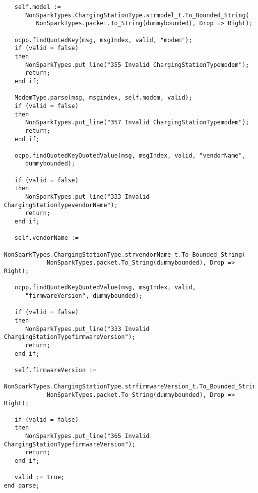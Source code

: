 \documentclass[12pt,openany,a4paper]{book}
\begin{document}
\begin{verbatim}
   self.model :=
      NonSparkTypes.ChargingStationType.strmodel_t.To_Bounded_String(
         NonSparkTypes.packet.To_String(dummybounded), Drop => Right);

   ocpp.findQuotedKey(msg, msgIndex, valid, "modem");
   if (valid = false) 
   then 
      NonSparkTypes.put_line("355 Invalid ChargingStationTypemodem"); 
      return; 
   end if;

   ModemType.parse(msg, msgindex, self.modem, valid);
   if (valid = false) 
   then 
      NonSparkTypes.put_line("357 Invalid ChargingStationTypemodem"); 
      return; 
   end if;

   ocpp.findQuotedKeyQuotedValue(msg, msgIndex, valid, "vendorName", 
      dummybounded);

   if (valid = false) 
   then 
      NonSparkTypes.put_line("333 Invalid ChargingStationTypevendorName"); 
      return; 
   end if;

   self.vendorName := 
         NonSparkTypes.ChargingStationType.strvendorName_t.To_Bounded_String(
            NonSparkTypes.packet.To_String(dummybounded), Drop => Right);

   ocpp.findQuotedKeyQuotedValue(msg, msgIndex, valid, 
      "firmwareVersion", dummybounded);

   if (valid = false) 
   then 
      NonSparkTypes.put_line("333 Invalid ChargingStationTypefirmwareVersion"); 
      return; 
   end if;

   self.firmwareVersion := 
      NonSparkTypes.ChargingStationType.strfirmwareVersion_t.To_Bounded_String(
            NonSparkTypes.packet.To_String(dummybounded), Drop => Right);

   if (valid = false) 
   then 
      NonSparkTypes.put_line("365 Invalid ChargingStationTypefirmwareVersion"); 
      return; 
   end if;

   valid := true;
end parse;


\end{verbatim}
\end{document}

